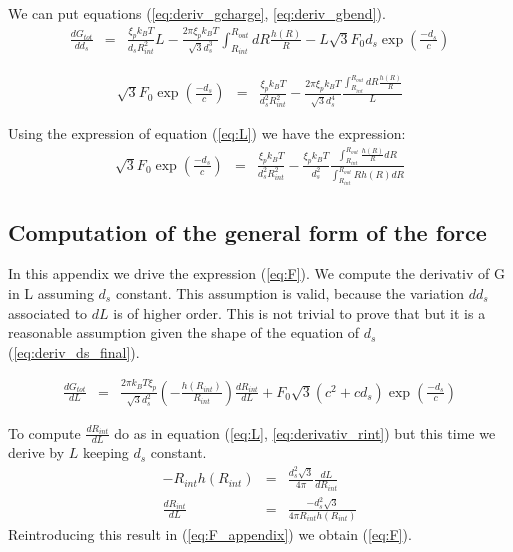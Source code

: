 \documentclass{article}
\begin{document}
We can put equations (\ref{eq:deriv_gcharge}, \ref{eq:deriv_gbend}). 
\begin{eqnarray*}
    \frac{d G_{tot}}{d d_s} &=& \frac{\xi_p k_B T}{d_s R_{int}^2} L - \frac{2 \pi \xi_p k_B T}{\sqrt{3} d_s^3} \int_{R_{int}}^{R_{out}} dR \frac{h(R)}{R} - L \sqrt{3} F_0 d_s \exp{ \left( \frac{-d_s}{c} \right)}
\end{eqnarray*}

\begin{eqnarray}
    \sqrt{3}F_0 \exp{ \left( \frac{-d_s}{c} \right)} &=& \frac{\xi_p k_B T}{d_s^2 R_{int}^2 } - \frac{2 \pi \xi_p k_B T}{\sqrt{3} d_s^4} \frac{\int_{R_{int}}^{R_{out}} dR \frac{h(R)}{R}}{L} 
    \label{eq:deriv_ds}
\end{eqnarray}

Using the expression of equation (\ref{eq:L}) we have the expression:
\begin{eqnarray}
    \sqrt{3} F_0 \exp{ \left( \frac{-d_s}{c} \right) } &=& \frac{\xi_p k_B T}{d_s^2 R_{int}^2} - \frac{\xi_p k_B T}{d_s^2} \frac{\int_{R_{int}}^{R_{out}} \frac{h(R)}{R} dR}{\int_{R_{int}}^{R_{out}} R h(R) dR} 
\end{eqnarray}

\subsection*{Computation of the general form of the force \label{sec:appenForce}}

In this appendix we drive the expression (\ref{eq:F}). We compute the derivativ of G in L assuming $d_s$ constant. This assumption is valid, because the variation $d d_s$ associated to $dL$ is of higher order. This is not trivial to prove that but it is a reasonable assumption given the shape of the equation of $d_s$ (\ref{eq:deriv_ds_final}).

\begin{eqnarray}
    \frac{d G_{tot}}{d L} &=& \frac{2 \pi k_B T \xi_p}{\sqrt{3} d_s^2} \left( - \frac{h(R_{int})}{R_{int}} \right) \frac{d R_{int}}{d L} + F_0 \sqrt{3} \left( c^2 + c d_s \right) \exp{ \left( \frac{-d_s}{c} \right) }
    \label{eq:F_appendix}
\end{eqnarray}

To compute $\frac{d R_{int}}{d L} $ do as in equation (\ref{eq:L}, \ref{eq:derivativ_rint}) but this time we derive by $L$ keeping $d_s$ constant.
\begin{eqnarray*}
    -R_{int} h(R_{int}) &=& \frac{d_s^2 \sqrt{3}}{4 \pi} \frac{ d L}{d R_{int}} \\
    \frac{d R_{int}}{dL} &=& \frac{ - d_s^2 \sqrt{3} }{ 4 \pi R_{int} h(R_{int}) }
\end{eqnarray*}
Reintroducing this result in (\ref{eq:F_appendix}) we obtain (\ref{eq:F}).
\end{document}
